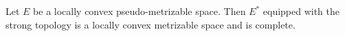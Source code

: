 Let $E$ be a locally convex pseudo-metrizable space. Then $E^*$ equipped with the strong topology is a locally convex metrizable space and is complete.
